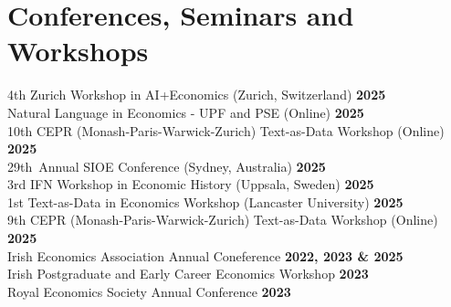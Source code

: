 \documentclass{resume}
\begin{document}
\section{Conferences, Seminars and Workshops} 
\begin{content}
    {4th Zurich Workshop in AI+Economics (Zurich, Switzerland)} \hfill {\bf 2025} \\
    {Natural Language in Economics - UPF and PSE (Online)} \hfill {\bf 2025} \\
    {10th CEPR (Monash-Paris-Warwick-Zurich) Text-as-Data Workshop (Online)} \hfill {\bf 2025} \\
    {29th Annual SIOE Conference (Sydney, Australia)} \hfill {\bf 2025} \\
    {3rd IFN Workshop in Economic History (Uppsala, Sweden)} \hfill {\bf 2025} \\
    {1st Text-as-Data in Economics Workshop (Lancaster University)} \hfill {\bf 2025} \\
    {9th CEPR (Monash-Paris-Warwick-Zurich) Text-as-Data Workshop (Online)} \hfill {\bf 2025} \\
    {Irish Economics Association Annual Coneference} \hfill {\bf 2022, 2023 \& 2025} \\
    {Irish Postgraduate and Early Career Economics Workshop} \hfill {\bf 2023}\\
    {Royal Economics Society Annual Conference} \hfill {\bf 2023} \\
\sectionlineskip
\end{content}
\vspace{-3\medskipamount}
\end{document}
